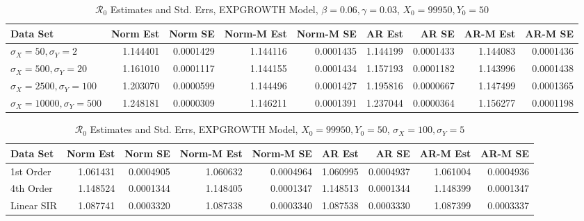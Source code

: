 \documentclass[12pt]{article}
\newcommand{\rr}{\ensuremath{\mathcal{R}_0}}
\begin{document}
\begin{table}[H]
	
	\caption{\label{tab:}$\rr$ Estimates and Std. Errs, EXPGROWTH Model,
		$\beta = 0.06, \gamma = 0.03$, $X_0 = 99950, Y_0 = 50$}
	\centering
	\begin{tabular}[t]{l|r|r|r|r|r|r|r|r}
		\hline
		Data Set & Norm Est & Norm SE & Norm-M Est & Norm-M SE & AR Est & AR SE & AR-M Est & AR-M SE\\
		\hline
		$\sigma_X = 50, \sigma_Y = 2$ & 1.144401 & 0.0001429 & 1.144116 & 0.0001435 & 1.144199 & 0.0001433 & 1.144083 & 0.0001436\\
		\hline
		$\sigma_X = 500, \sigma_Y = 20$ & 1.161010 & 0.0001117 & 1.144155 & 0.0001434 & 1.157193 & 0.0001182 & 1.143996 & 0.0001438\\
		\hline
		$\sigma_X = 2500, \sigma_Y = 100$ & 1.203070 & 0.0000599 & 1.144496 & 0.0001427 & 1.195816 & 0.0000667 & 1.147499 & 0.0001365\\
		\hline
		$\sigma_X = 10000, \sigma_Y = 500$ & 1.248181 & 0.0000309 & 1.146211 & 0.0001391 & 1.237044 & 0.0000364 & 1.156277 & 0.0001198\\
		\hline
	\end{tabular}
\end{table}

\begin{table}[H]
	
	\caption{\label{tab:}$\rr$ Estimates and Std. Errs, EXPGROWTH Model,
		$X_0 = 99950, Y_0 = 50$, $\sigma_X = 100, \sigma_Y = 5$}
	\centering
	\begin{tabular}[t]{l|r|r|r|r|r|r|r|r}
		\hline
		Data Set & Norm Est & Norm SE & Norm-M Est & Norm-M SE & AR Est & AR SE & AR-M Est & AR-M SE\\
		\hline
		1st Order & 1.061431 & 0.0004905 & 1.060632 & 0.0004964 & 1.060995 & 0.0004937 & 1.061004 & 0.0004936\\
		\hline
		4th Order & 1.148524 & 0.0001344 & 1.148405 & 0.0001347 & 1.148513 & 0.0001344 & 1.148399 & 0.0001347\\
		\hline
		Linear SIR & 1.087741 & 0.0003320 & 1.087338 & 0.0003340 & 1.087538 & 0.0003330 & 1.087399 & 0.0003337\\
		\hline
	\end{tabular}
\end{table}
\end{document}
